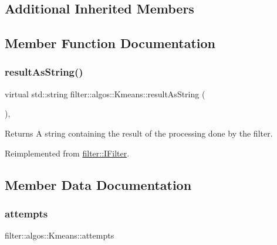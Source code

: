 \subsection*{Additional Inherited Members}


\subsection{Member Function Documentation}
\mbox{\label{classfilter_1_1algos_1_1_kmeans_aed99c18aeec39add2955b2b9b3361a8a}} 
\subsubsection{\texorpdfstring{result\+As\+String()}{resultAsString()}}
{\footnotesize\ttfamily virtual std\+::string filter\+::algos\+::\+Kmeans\+::result\+As\+String (\begin{DoxyParamCaption}{ }\end{DoxyParamCaption})\hspace{0.3cm}{\ttfamily [inline]}, {\ttfamily [virtual]}}

\begin{DoxyReturn}{Returns}
A string containing the result of the processing done by the filter. 
\end{DoxyReturn}


Reimplemented from \hyperlink{classfilter_1_1_i_filter_ab99902b060a6d9edc3452a8c9f85e37e}{filter\+::\+I\+Filter}.



\subsection{Member Data Documentation}
\mbox{\label{classfilter_1_1algos_1_1_kmeans_acf7a19eeb7e9e2290379094bf1d21dd9}} 
\subsubsection{\texorpdfstring{attempts}{attempts}}
{\footnotesize\ttfamily filter\+::algos\+::\+Kmeans\+::attempts}

